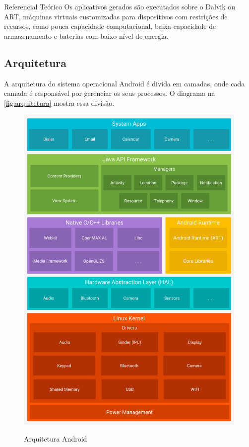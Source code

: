 \documentclass[
	12pt,				%
	openright,			%
	twoside,			%
	a4paper,			%
	english,			%
	french,				%
	spanish,			%
	brazil				%
	]{abntex2}
\begin{document}
\begin{chapter}{Referencial Teórico}
Os aplicativos gerados são executados sobre o Dalvik ou ART,  máquinas virtuais customizadas para dispositivos com restrições de recursos, como pouca capacidade computacional, baixa capacidade de armazenamento e baterias com baixo nível de energia.

\subsection{Arquitetura}
A arquitetura do sistema operacional Android é divida em camadas, onde cada camada é responsável por gerenciar os seus processos. O diagrama na \autoref{fig:arquitetura} mostra essa divisão.

\begin{figure}[h]
\centering
   \caption{Arquitetura Android}
   \includegraphics[scale=0.20]{media/android-stack_2x.png}
     \label{fig:arquitetura}
\end{figure}


\end{chapter}
\end{document}

